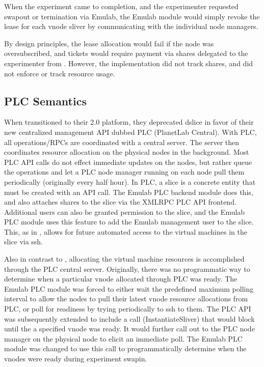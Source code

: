 When the \plab experiment came to completion, and the experimenter
requested swapout or termination via Emulab, the Emulab \dslice module
would simply revoke the lease for each \plab vnode sliver by
communicating with the individual \dslice node managers.

By design principles, the lease allocation would fail if the
node was oversubscribed, and tickets would require payment via shares
delegated to the experimenter from \plab.  However, the \dslice
implementation did not track shares, and did not enforce or track
resource usage.

\subsection{PLC Semantics}

When \plab transitioned to their 2.0 platform, they deprecated dslice
in favor of their new centralized management API dubbed PLC (PlanetLab
Central).  With PLC, all operations/RPCs are coordinated with a
central server.  The server then coordinates resource allocation on
the physical nodes in the background.  Most PLC API calls do not
effect immediate updates on the \plab nodes, but rather queue the
operations and let a PLC node manager running on each \plab node pull
them periodically (originally every half hour).  In PLC, a slice is a
concrete entity that must be created with an API call.  The Emulab PLC
\plab backend module does this, and also attaches shares to the slice
via the XMLRPC PLC API frontend.  Additional \plab users can also be
granted permission to the slice, and the Emulab PLC module uses this
feature to add the Emulab management user to the slice.  This, as in
\dslice, allows for future automated access to the virtual machines in
the slice via ssh.

Also in contrast to \dslice, allocating the virtual machine resources
is accomplished through the PLC central server.  Originally, there was
no programmatic way to determine when a particular vnode allocated
through PLC was ready.  The Emulab PLC module was forced to either
wait the predefined maximum polling interval to allow the \plab nodes
to pull their latest vnode resource allocations from PLC, or poll for
readiness by trying periodically to ssh to them.  The PLC API was
subsequently extended to include a call (InstantiateSliver) that would
block until the a specified vnode was ready.  It would further call
out to the PLC node manager on the physical \plab node to elicit an
immediate poll.  The Emulab PLC module was changed to use this call to
programmatically determine when the \plab vnodes were ready during
experiment swapin.

